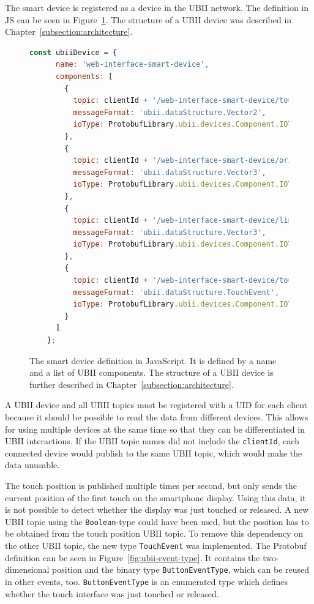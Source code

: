 The smart device is registered as a device in the \ac{UBII} network. The definition in \ac{JS} can be seen in Figure~\ref{fig:ubii-device-registration}. The structure of a \ac{UBII} device was described in Chapter~\ref{subsection:architecture}. 

\begin{figure}[H]
  \begin{lstlisting}[language=JavaScript]
    const ubiiDevice = {
      name: 'web-interface-smart-device',
      components: [
        {
          topic: clientId + '/web-interface-smart-device/touch_position',
          messageFormat: 'ubii.dataStructure.Vector2',
          ioType: ProtobufLibrary.ubii.devices.Component.IOType.INPUT
        },
        {
          topic: clientId + '/web-interface-smart-device/orientation',
          messageFormat: 'ubii.dataStructure.Vector3',
          ioType: ProtobufLibrary.ubii.devices.Component.IOType.INPUT
        },
        {
          topic: clientId + '/web-interface-smart-device/linear_acceleration',
          messageFormat: 'ubii.dataStructure.Vector3',
          ioType: ProtobufLibrary.ubii.devices.Component.IOType.INPUT
        },
        {
          topic: clientId + '/web-interface-smart-device/touch_events',
          messageFormat: 'ubii.dataStructure.TouchEvent',
          ioType: ProtobufLibrary.ubii.devices.Component.IOType.INPUT
        }
      ]
    };
  \end{lstlisting}
  \caption[Protobuf definition of the smart device]{The smart device definition in JavaScript. It is defined by a name and a list of \ac{UBII} components. The structure of a \ac{UBII} device is further described in Chapter~\ref{subsection:architecture}.}\label{fig:ubii-device-registration}
\end{figure}

A \ac{UBII} device and all \ac{UBII} topics must be registered with a \ac{UID} for each client because it should be possible to read the data from different devices. This allows for using multiple devices at the same time so that they can be differentiated in \ac{UBII} interactions. If the \ac{UBII} topic names did not include the \lstinline{clientId}, each connected device would publish to the same \ac{UBII} topic, which would make the data unusable.

The touch position is published multiple times per second, but only sends the current position of the first touch on the smartphone display. Using this data, it is not possible to detect whether the display was just touched or released. A new \ac{UBII} topic using the \lstinline{Boolean}-type could have been used, but the position has to be obtained from the touch position \ac{UBII} topic. To remove this dependency on the other \ac{UBII} topic, the new type \lstinline{TouchEvent} was implemented. The \ac{Protobuf} definition can be seen in Figure~\ref{fig:ubii-event-type}. It contains the two-dimensional position and the binary type \mbox{\lstinline{ButtonEventType},} which can be reused in other events, too. \lstinline{ButtonEventType} is an enumerated type which defines whether the touch interface was just touched or released.

